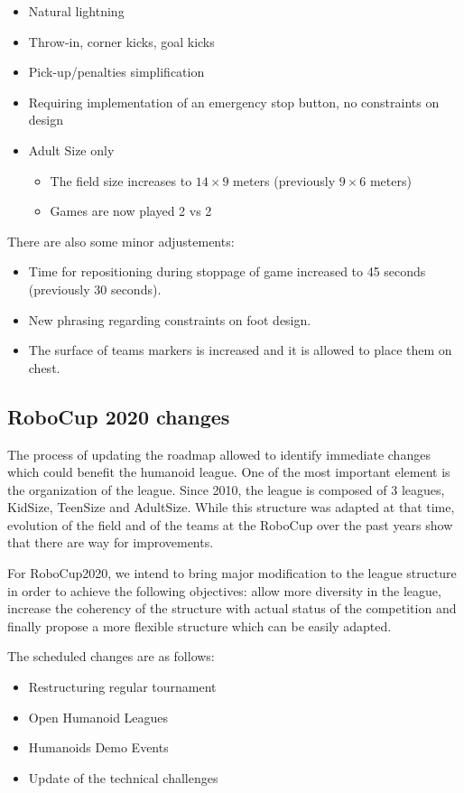 \documentclass{article}
\begin{document}
\begin{itemize}
\item Natural lightning
\item Throw-in, corner kicks, goal kicks %
\item Pick-up/penalties simplification
\item Requiring implementation of an emergency stop button, no constraints on design
\item Adult Size only
  \begin{itemize}
  \item The field size increases to $14 \times 9$ meters (previously $9 \times 6$ meters)
  \item Games are now played 2 vs 2
  \end{itemize}
\end{itemize}

There are also some minor adjustements:

\begin{itemize}
\item Time for repositioning during stoppage of game increased to 45 seconds (previously 30 seconds).
\item New phrasing regarding constraints on foot design.
\item The surface of teams markers is increased and it is allowed to place them on chest.
\end{itemize}

\subsection{RoboCup 2020 changes}

The process of updating the roadmap allowed to identify immediate changes which
could benefit the humanoid league.
One of the most important element is the organization of the league. Since 2010,
the league is composed of 3 leagues, KidSize, TeenSize and AdultSize.
While this structure was adapted at that time, evolution of the field and of the
teams at the RoboCup over the past years show that there are way for improvements.

For RoboCup2020, we intend to bring major modification to the league structure
in order to achieve the following objectives:
allow more diversity in the league,
increase the coherency of the structure with actual status of the competition
and finally propose a more flexible structure which can be easily adapted.

The scheduled changes are as follows:
\begin{itemize}
\item Restructuring regular tournament
\item Open Humanoid Leagues
\item Humanoids Demo Events
\item Update of the technical challenges
\end{itemize}
\end{document}
